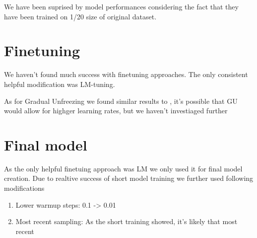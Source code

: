 We have been suprised by model performances considering the fact that they have been trained
on 1/20 size of original dataset. 


\section{Finetuning}
We haven't found much success with finetuning approaches.
The only consistent helpful modification was LM-tuning.

As for Gradual Unfreezing we found similar results to ,
it's possible that GU would allow for highger learning rates, but we haven't
investiaged further

\section{Final model}
As the only helpful finetuing approach was LM we only used it for final model creation.
Due to realtive success of short model training we further used following modifications
\begin{enumerate}
    \item Lower warmup steps: 0.1 -> 0.01
    \item Most recent sampling: As the short training showed, it's likely
    that most recent 
\end{enumerate}





